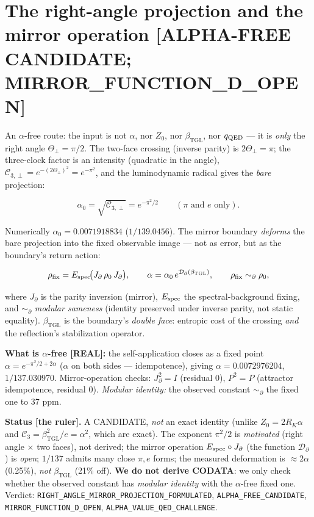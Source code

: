\documentclass[11pt]{article}
\newcommand{\bTGL}{\beta_{\mathrm{TGL}}}\newcommand{\Msun}{M_{\odot}}\newcommand{\TGL}{\mathrm{TGL}}
\theoremstyle{definition}\newtheorem{deriv}{Derivation}
\begin{document}
\section{The right-angle projection and the mirror operation \textsf{[ALPHA-FREE CANDIDATE; MIRROR\_FUNCTION\_D\_OPEN]}}

An $\alpha$-free route: the input is not $\alpha$, nor $Z_0$, nor $\bTGL$, nor $q_{\rm QED}$ --- it is \emph{only} the right angle $\Theta_\perp=\pi/2$. The two-face crossing (inverse parity) is $2\Theta_\perp=\pi$; the three-clock factor is an intensity (quadratic in the angle), $\mathcal C_{3,\perp}=e^{-(2\Theta_\perp)^2}=e^{-\pi^2}$, and the luminodynamic radical gives the \emph{bare} projection:

\begin{equation} \alpha_0=\sqrt{\mathcal C_{3,\perp}}=e^{-\pi^2/2}\qquad(\pi\text{ and }e\text{ only}).\end{equation}

Numerically $\alpha_0=0.0071918834$ ($1/139.0456$). The mirror boundary \emph{deforms} the bare projection into the fixed observable image --- not as error, but as the boundary's return action:

\begin{equation} \rho_{\rm fix}=E_{\rm spec}\!\big(J_\partial\,\rho_0\,J_\partial\big),\qquad \alpha=\alpha_0\,e^{\mathcal D_\partial(\bTGL)},\qquad \rho_{\rm fix}\sim_\partial\rho_0,\end{equation}

where $J_\partial$ is the parity inversion (mirror), $E_{\rm spec}$ the spectral-background fixing, and $\sim_\partial$ \emph{modular sameness} (identity preserved under inverse parity, not static equality). $\bTGL$ is the boundary's \emph{double face}: entropic cost of the crossing \emph{and} the reflection's stabilization operator.

\textbf{What is $\alpha$-free \textsf{[REAL]}:} the self-application closes as a fixed point $\alpha=e^{-\pi^2/2+2\alpha}$ ($\alpha$ on both sides --- idempotence), giving $\alpha=0.0072976204$, $1/137.030970$. Mirror-operation checks: $J_\partial^2=I$ (residual $0$), $P^2=P$ (attractor idempotence, residual $0$). \emph{Modular identity:} the observed constant $\sim_\partial$ the fixed one to $37$ ppm.

\textbf{Status \textsf{[the ruler]}.} A CANDIDATE, \emph{not} an exact identity (unlike $Z_0=2R_K\alpha$ and $\mathcal C_3=\bTGL^2/e=\alpha^2$, which are exact). The exponent $\pi^2/2$ is \emph{motivated} (right angle $\times$ two faces), not derived; the mirror operation $E_{\rm spec}\circ J_\partial$ (the function $\mathcal D_\partial$) is \emph{open}; $1/137$ admits many close $\pi,e$ forms; the measured deformation is $\approx 2\alpha$ (0.25\%), \emph{not} $\bTGL$ (21\% off). \textbf{We do not derive CODATA}: we only check whether the observed constant has \emph{modular identity} with the $\alpha$-free fixed one. Verdict: \texttt{RIGHT\_ANGLE\_MIRROR\_PROJECTION\_FORMULATED}, \texttt{ALPHA\_FREE\_CANDIDATE}, \texttt{MIRROR\_FUNCTION\_D\_OPEN}, \texttt{ALPHA\_VALUE\_QED\_CHALLENGE}.
\end{document}
